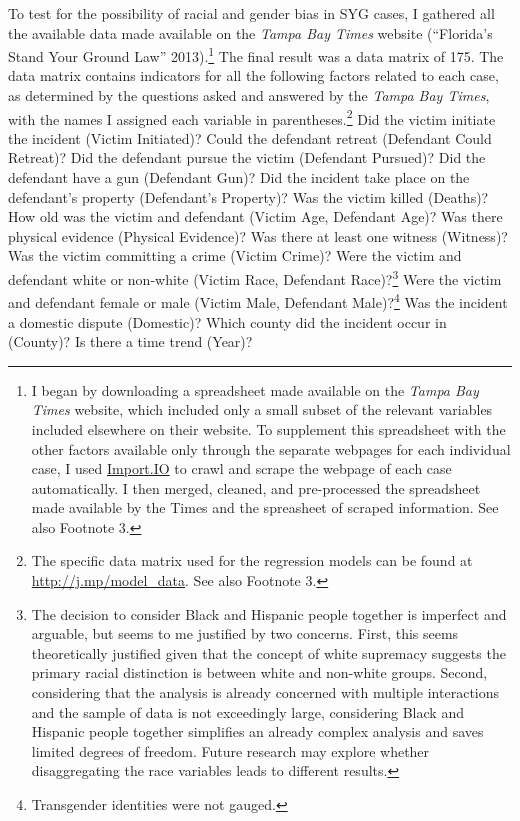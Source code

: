 \documentclass[12pt,article]{article}
\begin{document}
To test for the possibility of racial and gender bias in SYG cases, I
gathered all the available data made available on the \emph{Tampa Bay
Times} website (``Florida's Stand Your Ground Law'' 2013).\footnote{I
  began by downloading a spreadsheet made available on the \emph{Tampa
  Bay Times} website, which included only a small subset of the relevant
  variables included elsewhere on their website. To supplement this
  spreadsheet with the other factors available only through the separate
  webpages for each individual case, I used
  \href{http://import.io}{Import.IO} to crawl and scrape the webpage of
  each case automatically. I then merged, cleaned, and pre-processed the
  spreadsheet made available by the Times and the spreasheet of scraped
  information. See also Footnote 3.} The final result was a data matrix
of 175. The data matrix contains indicators for all the following
factors related to each case, as determined by the questions asked and
answered by the \emph{Tampa Bay Times}, with the names I assigned each
variable in parentheses.\footnote{The specific data matrix used for the
  regression models can be found at
  \href{http://j.mp/model_data}{\url{http://j.mp/model_data}}. See also
  Footnote 3.} Did the victim initiate the incident (Victim Initiated)?
Could the defendant retreat (Defendant Could Retreat)? Did the defendant
pursue the victim (Defendant Pursued)? Did the defendant have a gun
(Defendant Gun)? Did the incident take place on the defendant's property
(Defendant's Property)? Was the victim killed (Deaths)? How old was the
victim and defendant (Victim Age, Defendant Age)? Was there physical
evidence (Physical Evidence)? Was there at least one witness (Witness)?
Was the victim committing a crime (Victim Crime)? Were the victim and
defendant white or non-white (Victim Race, Defendant Race)?\footnote{The
  decision to consider Black and Hispanic people together is imperfect
  and arguable, but seems to me justified by two concerns. First, this
  seems theoretically justified given that the concept of white
  supremacy suggests the primary racial distinction is between white and
  non-white groups. Second, considering that the analysis is already
  concerned with multiple interactions and the sample of data is not
  exceedingly large, considering Black and Hispanic people together
  simplifies an already complex analysis and saves limited degrees of
  freedom. Future research may explore whether disaggregating the race
  variables leads to different results.} Were the victim and defendant
female or male (Victim Male, Defendant Male)?\footnote{Transgender
  identities were not gauged.} Was the incident a domestic dispute
(Domestic)? Which county did the incident occur in (County)? Is there a
time trend (Year)?
\end{document}
